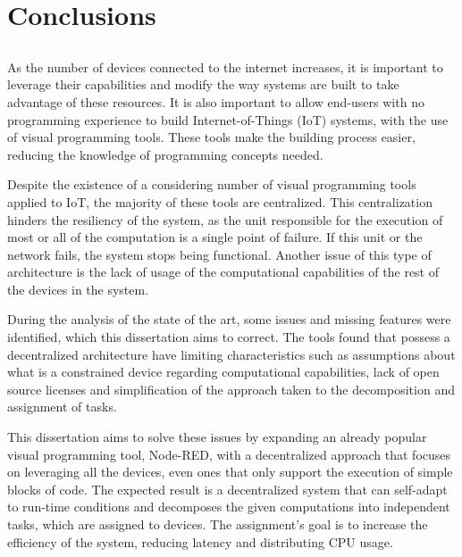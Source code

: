 \chapter{Conclusions} \label{chap:concl} \minitoc

\section*{}


As the number of devices connected to the internet increases, it is important to leverage their capabilities and modify the way systems are built to take advantage of these resources. It is also important to allow end-users with no programming experience to build Internet-of-Things (IoT) systems, with the use of visual programming tools. These tools make the building process easier, reducing the knowledge of programming concepts needed.

Despite the existence of a considering number of visual programming tools applied to IoT, the majority of these tools are centralized. This centralization hinders the resiliency of the system, as the unit responsible for the execution of most or all of the computation is a single point of failure. If this unit or the network fails, the system stops being functional. Another issue of this type of architecture is the lack of usage of the computational capabilities of the rest of the devices in the system.

During the analysis of the state of the art, some issues and missing features were identified, which this dissertation aims to correct. The tools found that possess a decentralized architecture have limiting characteristics such as assumptions about what is a constrained device regarding computational capabilities, lack of open source licenses and simplification of the approach taken to the decomposition and assignment of tasks.

This dissertation aims to solve these issues by expanding an already popular visual programming tool, Node-RED, with a decentralized approach that focuses on leveraging all the devices, even ones that only support the execution of simple blocks of code. The expected result is a decentralized system that can self-adapt to run-time conditions and decomposes the given computations into independent tasks, which are assigned to devices. The assignment's goal is to increase the efficiency of the system, reducing latency and distributing CPU usage.  


